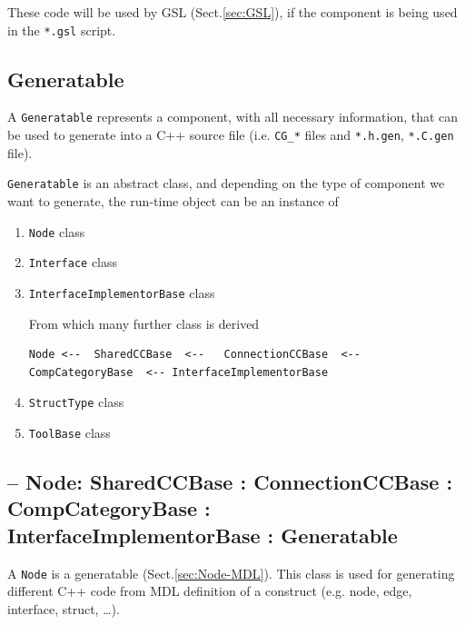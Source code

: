 These code will be used by GSL (Sect.\ref{sec:GSL}), if the component is being
used in the \verb!*.gsl! script.


\subsection{Generatable}
\label{sec:Generatable-class}

A \verb!Generatable! represents a component, with all necessary information,
that can be used to generate into a C++ source file (i.e. \verb!CG_*! files and
\verb!*.h.gen!, \verb!*.C.gen! file).

\verb!Generatable! is an abstract class, and depending on the type of component
we want to generate, the run-time object can be an instance of 
\begin{enumerate}
  \item \verb!Node! class
  
  \item \verb!Interface! class
  
  \item \verb!InterfaceImplementorBase! class
  
  From which many further class is derived
\begin{verbatim}
Node <--  SharedCCBase  <--   ConnectionCCBase  <--   CompCategoryBase  <-- InterfaceImplementorBase
\end{verbatim}
  
  \item \verb!StructType! class 
  
  \item \verb!ToolBase! class 
\end{enumerate}

\subsection{-- Node: SharedCCBase : ConnectionCCBase : CompCategoryBase : InterfaceImplementorBase : Generatable}

A \verb!Node! is a generatable (Sect.\ref{sec:Node-MDL}). This class is used for
generating different C++ code from MDL definition of a construct (e.g. node,
edge, interface, struct, \ldots).

